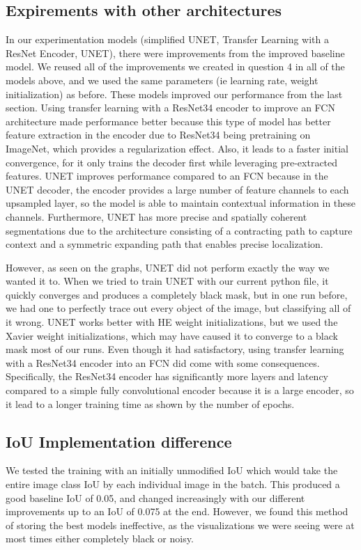 \documentclass{article}
\begin{document}
\subsection{Expirements with other architectures}
In our experimentation models (simplified UNET, Transfer Learning with a ResNet Encoder, UNET), there were improvements from the improved baseline model. We reused all of the improvements we created in question 4 in all of the models above, and we used the same parameters (ie learning rate, weight initialization) as before. These models improved our performance from the last section. Using transfer learning with a ResNet34 encoder to improve an FCN architecture made performance better because this type of model has better feature extraction in the encoder due to ResNet34 being pretraining on ImageNet, which provides a regularization effect. Also, it leads to a faster initial convergence, for it only trains the decoder first while leveraging pre-extracted features. UNET improves performance compared to an FCN because in the UNET decoder, the encoder provides a large number of feature channels to each upsampled layer, so the model is able to maintain contextual information in these channels. Furthermore, UNET has more precise and spatially coherent segmentations due to the architecture consisting of a contracting path to capture context and a symmetric expanding path that enables precise localization.

However, as seen on the graphs, UNET did not perform exactly the way we wanted it to. When we tried to train UNET with our current python file, it quickly converges and produces a completely black mask, but in one run before, we had one to perfectly trace out every object of the image, but classifying all of it wrong. 
UNET works better with HE weight initializations, but we used the Xavier weight initializations, which may have caused it to converge to a black mask most of our runs. Even though it had satisfactory, using transfer learning with a ResNet34 encoder into an FCN did come with some consequences. Specifically, the ResNet34 encoder has significantly more layers and latency compared to a simple fully convolutional encoder because it is a large encoder, so it lead to a longer training time as shown by the number of epochs.

\subsection{IoU Implementation difference}
We tested the training with an initially unmodified IoU which would take the entire image class IoU by each individual image in the batch. This produced a good baseline IoU of 0.05, and changed increasingly with our different improvements up to an IoU of 0.075 at the end. However, we found this method of storing the best models ineffective, as the visualizations we were seeing were at most times either completely black or noisy.
\end{document}
